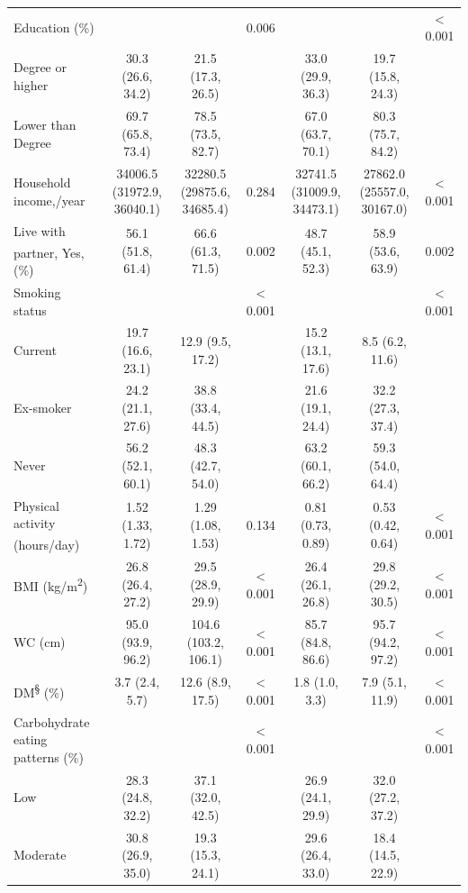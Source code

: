 \begin{table}
\begin{tabular}[t]{lcccccc}
		Education (\%) &  &  & 0.006 &  &  & < 0.001\\
		\hspace{1em}Degree or higher & 30.3 (26.6, 34.2) & 21.5 (17.3, 26.5) &  & 33.0 (29.9, 36.3) & 19.7 (15.8, 24.3) & \\
		\hspace{1em}Lower than Degree & 69.7 (65.8, 73.4) & 78.5 (73.5, 82.7) &  & 67.0 (63.7, 70.1) & 80.3 (75.7, 84.2) & \\
		Household income,\textsterling/year & 34006.5 (31972.9, 36040.1) & 32280.5 (29875.6, 34685.4) & 0.284 &  32741.5 (31009.9, 34473.1) & 27862.0 (25557.0, 30167.0)  &  < 0.001  \\
		Live with partner\textsuperscript{\ddag}, Yes, (\%) & 56.1 (51.8, 61.4) & 66.6 (61.3, 71.5) & 0.002   & 48.7 (45.1, 52.3) & 58.9 (53.6, 63.9)  & 0.002    \\
		Smoking status &  &  & < 0.001 &  &  & < 0.001\\
		\hspace{1em}Current & 19.7 (16.6, 23.1) & 12.9 (9.5, 17.2) &  & 15.2 (13.1, 17.6) & 8.5 (6.2, 11.6) & \\
		\hspace{1em}Ex-smoker & 24.2 (21.1, 27.6) & 38.8 (33.4, 44.5) &  & 21.6 (19.1, 24.4) & 32.2 (27.3, 37.4) & \\
		\hspace{1em}Never & 56.2 (52.1, 60.1) & 48.3 (42.7, 54.0) &  & 63.2 (60.1, 66.2) & 59.3 (54.0, 64.4) & \\
		Physical
		activity (hours/day) \textsuperscript{\dag} & 1.52 (1.33, 1.72) & 1.29 (1.08, 1.53) & 0.134 & 0.81 (0.73, 0.89) & 0.53 (0.42, 0.64) & < 0.001\\
		BMI (kg/m\textsuperscript{2}) & 26.8 (26.4, 27.2) & 29.5 (28.9, 29.9) & < 0.001 & 26.4 (26.1, 26.8) & 29.8 (29.2, 30.5) & < 0.001\\
		WC (cm) & 95.0 (93.9, 96.2) & 104.6 (103.2, 106.1) & < 0.001 & 85.7 (84.8, 86.6) & 95.7 (94.2, 97.2) & < 0.001\\
		DM\textsuperscript{\S} (\%) & 3.7 (2.4, 5.7) & 12.6 (8.9, 17.5) & < 0.001 & 1.8 (1.0, 3.3) & 7.9 (5.1, 11.9) & < 0.001 \\ 
		Carbohydrate eating patterns (\%) &  &  & < 0.001 &  &  & < 0.001\\
		\hspace{1em}Low & 28.3 (24.8, 32.2) & 37.1 (32.0, 42.5) &  & 26.9 (24.1, 29.9) & 32.0 (27.2, 37.2) & \\
		\hspace{1em}Moderate & 30.8 (26.9, 35.0) & 19.3 (15.3, 24.1) &  & 29.6 (26.4, 33.0) & 18.4 (14.5, 22.9) & \\

\end{tabular}
\end{table}
